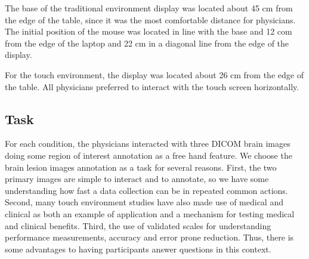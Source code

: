 \documentclass{sigchi}
\begin{document}
The base of the traditional environment display was located about 45 cm from the edge of the table, since it was the most comfortable distance for physicians. The initial position of the mouse was located in line with the base and 12 com from the edge of the laptop and 22 cm in a diagonal line from the edge of the display.

For the touch environment, the display was located about 26 cm from the edge of the table. All physicians preferred to interact with the touch screen horizontally.

\subsection{Task}

For each condition, the physicians interacted with three DICOM brain images doing some region of interest annotation as a free hand feature. We choose the brain lesion images annotation as a task for several reasons. First, the two primary images are simple to interact and to annotate, so we have some understanding how fast a data collection can be in repeated common actions. Second, many touch environment  studies \cite{holzinger2002finger} have also made use of medical and clinical as both an example of application \cite{houben2014hypr, augstein2013fun, tsang2001improvement} and a mechanism for testing medical and clinical benefits. Third, the use of validated scales for understanding performance measurements, accuracy and error prone reduction. Thus, there is some advantages to having participants answer questions in this context.
\end{document}
